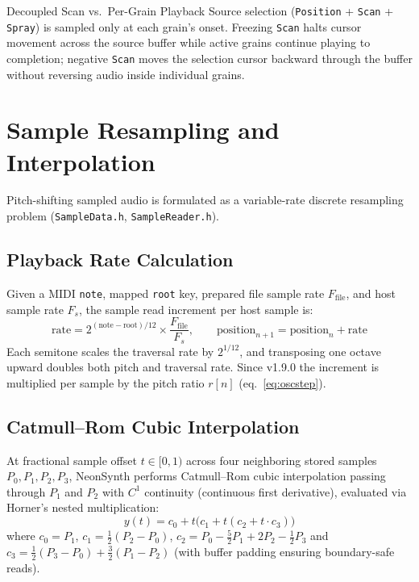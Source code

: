\documentclass[11pt,letterpaper]{article}
\newcommand{\code}[1]{\texttt{\textcolor{codegray}{#1}}}
\newcommand{\Fs}{F_s}
\begin{document}
\begin{callout}{Decoupled Scan vs.\ Per-Grain Playback}
Source selection (\code{Position} + \code{Scan} + \code{Spray}) is sampled only at each grain's onset. Freezing \code{Scan} halts
cursor movement across the source buffer while active grains continue playing to completion; negative \code{Scan}
moves the selection cursor backward through the buffer without reversing audio inside individual grains.
\end{callout}

\newpage
\section{Sample Resampling and Interpolation}\label{sec:smp}

Pitch-shifting sampled audio is formulated as a variable-rate discrete resampling problem (\code{SampleData.h},
\code{SampleReader.h}).

\subsection{Playback Rate Calculation}

Given a MIDI \code{note}, mapped \code{root} key, prepared file sample rate $F_{\mathrm{file}}$, and host sample rate $\Fs$, the sample read
increment per host sample is:
\begin{equation}\label{eq:rate}
  \mathrm{rate} = 2^{(\mathrm{note}-\mathrm{root})/12} \times \frac{F_{\mathrm{file}}}{\Fs}, \qquad \mathrm{position}_{n+1} = \mathrm{position}_n + \mathrm{rate}
\end{equation}
Each semitone scales the traversal rate by $2^{1/12}$, and transposing one octave upward doubles both pitch and traversal
rate. Since v1.9.0 the increment is multiplied per sample by the pitch ratio $r[n]$ (eq.~\eqref{eq:oscstep}).

\subsection{Catmull--Rom Cubic Interpolation}

At fractional sample offset $t \in [0,1)$ across four neighboring stored samples $P_0, P_1, P_2, P_3$, NeonSynth performs
Catmull--Rom cubic interpolation passing through $P_1$ and $P_2$ with $C^1$ continuity (continuous first derivative),
evaluated via Horner's nested multiplication:
\begin{equation}\label{eq:horner}
  y(t) = c_0 + t\bigl(c_1 + t(c_2 + t \cdot c_3)\bigr)
\end{equation}
where $c_0 = P_1$, $c_1 = \tfrac12(P_2 - P_0)$, $c_2 = P_0 - \tfrac52 P_1 + 2P_2 - \tfrac12 P_3$ and
$c_3 = \tfrac12(P_3 - P_0) + \tfrac32(P_1 - P_2)$ (with buffer padding ensuring boundary-safe reads).
\end{document}

